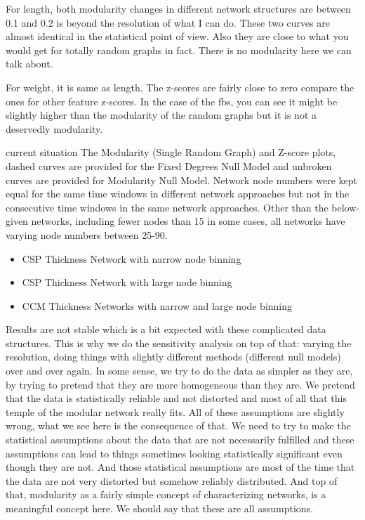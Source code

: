 {	For length, both modularity changes in different network structures are between 0.1 and 0.2 is beyond the resolution of what I can do. These two curves are almost identical in the statistical point of view. Also they are close to what you would get for totally random graphs in fact. There is no modularity here we can talk about.
	
	For weight, it is same as length. The z-scores are fairly close to zero compare the ones for other feature z-scores. In the case of the fbs, you can see it might be slightly higher than the modularity of the random graphs but it is not a deservedly modularity.
	
	
	current situation
	The Modularity (Single Random Graph) and Z-score plots, dashed curves are provided for the Fixed Degrees Null Model and unbroken curves are provided for Modularity Null Model.
	Network node numbers were kept equal for the same time windows in different network approaches but not in the consecutive time windows in the same network approaches.
	Other than the below-given networks, including fewer nodes than 15 in some cases, all networks have varying node numbers between 25-90.
	\begin{itemize}
		\item CSP Thickness Network with narrow node binning
		\item CSP Thickness Network with large node binning
		\item CCM Thickness Networks with narrow and large node binning
	\end{itemize}

Results are not stable which is a bit expected with these complicated data structures. This is why we do the sensitivity analysis on top of that: varying the resolution, doing things with slightly different methods (different null models) over and over again. In some sense, we try to do the data as simpler as they are, by trying to pretend that they are more homogeneous than they are. We pretend that the data is statistically reliable and not distorted and most of all that this temple of the modular network really fits. All of these assumptions are slightly wrong, what we see here is the consequence of that. We need to try to make the statistical assumptions about the data that are not necessarily fulfilled and these assumptions can lead to things sometimes looking statistically significant even though they are not. And those statistical assumptions are most of the time that the data are not very distorted but somehow reliably distributed. And top of that, modularity as a fairly simple concept of characterizing networks, is a meaningful concept here. We should say that these are all assumptions.}

